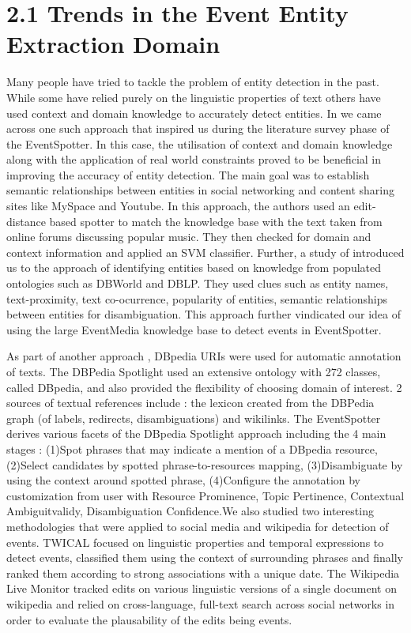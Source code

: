 \documentclass[a4paper,11pt]{report}
\begin{document}
\section*{2.1 Trends in the Event Entity Extraction Domain}
Many people have tried to tackle the problem of entity detection in the past. While some have relied purely on the linguistic properties of text others have used context and domain knowledge to accurately detect entities. In \cite{Gruhl_contextand} we came across one such approach that inspired us during the literature survey phase of the EventSpotter. In this case, the utilisation of context and domain knowledge along with the application of real world constraints proved to be beneficial in improving the accuracy of entity detection. The main goal was to establish semantic relationships between entities in social networking and content sharing sites like MySpace and Youtube. In this approach, the authors used an edit-distance based spotter to match the knowledge base with the text taken from online forums discussing popular music. They then checked for domain and context information and applied an SVM classifier. Further, a study of \cite{Hassell06ontology-drivenautomatic} introduced us to the approach of identifying entities based on knowledge from populated ontologies such as DBWorld and DBLP. They used clues such as entity names, text-proximity, text co-ocurrence, popularity of entities, semantic relationships between entities for disambiguation. This approach further vindicated our idea of using the large EventMedia knowledge base to detect events in EventSpotter.\newline

As part of another approach , DBpedia URIs were used for automatic annotation of texts. The DBPedia Spotlight \cite{Mendes11dbpediaspotlight:} used an extensive ontology with 272 classes, called DBpedia, and also provided the flexibility of choosing domain of interest. 2 sources of textual references include : the lexicon created from the DBPedia graph (of labels, redirects, disambiguations) and wikilinks. The EventSpotter derives various facets of the DBpedia Spotlight approach including the 4 main stages : (1)Spot phrases that may indicate a mention of a DBpedia resource, (2)Select candidates by spotted phrase-to-resources mapping, (3)Disambiguate by using the context around spotted phrase, (4)Configure the annotation by customization from user with Resource Prominence, Topic Pertinence, Contextual Ambiguitvalidy, Disambiguation Confidence.We also studied two interesting methodologies that were applied to social media and wikipedia for detection of events. TWICAL \cite{Ritter_opendomain} focused on linguistic properties and temporal expressions to detect events, classified them using the context of surrounding phrases and finally ranked them according to strong associations with a unique date. The Wikipedia Live Monitor\cite{DBLP:journals/corr/abs-1303-4702} tracked edits on various linguistic versions of a single document on wikipedia and relied on cross-language, full-text search across social networks in order to evaluate the \cite{Hassell06ontology-drivenautomatic} plausability of the edits being events. \newline
\end{document}
